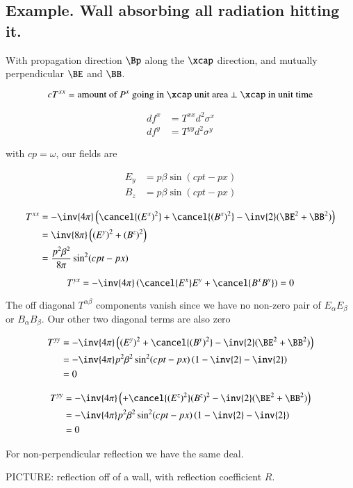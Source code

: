 \subsection{Example.  Wall absorbing all radiation hitting it.}

With propagation direction $\Bp$ along the $\xcap$ direction, and mutually perpendicular $\BE$ and $\BB$.

\begin{equation}\label{eqn:relativisticElectrodynamicsL23:410}
c T^{xx} = \text{amount of $P^x$ going in $\xcap$ unit area $\perp \xcap$ in unit time}
\end{equation}

\begin{align}\label{eqn:relativisticElectrodynamicsL23:430}
df^x &= T^{x x} d^2 \sigma^x \\
df^y &= T^{y y} d^2 \sigma^y
\end{align}

with $c p = \omega$, our fields are

\begin{align}\label{eqn:relativisticElectrodynamicsL23:450}
E_y &= p \beta \sin( c p t - p x ) \\
B_z &= p \beta \sin( c p t - p x ) 
\end{align}

\begin{align*}
T^{x x} 
&= -\inv{4 \pi} \left( 
\cancel{(E^x)^2}
+\cancel{(B^x)^2}
-\inv{2} (\BE^2 + \BB^2) \right) \\
&= \inv{8 \pi} \left( 
(E^y)^2
+(B^z)^2 \right) \\
&= \frac{p^2 \beta^2}{8 \pi} \sin^2 ( c p t - p x )
\end{align*}

\begin{equation}\label{eqn:relativisticElectrodynamicsL23:470}
T^{y x} = - \inv{4 \pi} \left( 
\cancel{ E^x } E^y + \cancel{ B^x B^y } \right) = 0
\end{equation}

The off diagonal $T^{\alpha \beta}$ components vanish since we have no non-zero pair of $E_\alpha E_\beta$ or $B_\alpha B_\beta$.  Our other two diagonal terms are also zero

\begin{align*}
T^{y y}
&= -\inv{4 \pi} \left( 
(E^y)^2
+\cancel{(B^y)^2}
-\inv{2} (\BE^2 + \BB^2) \right) \\
&= - \inv{4 \pi} p^2 \beta^2 \sin^2 ( c p t - p x ) \left( 1 - \inv{2} - \inv{2} \right) \\
&= 0
\end{align*}

\begin{align*}
T^{y y}
&= -\inv{4 \pi} \left( 
+\cancel{(E^z)^2}
(B^z)^2
-\inv{2} (\BE^2 + \BB^2) \right) \\
&= - \inv{4 \pi} p^2 \beta^2 \sin^2 ( c p t - p x ) \left( 1 - \inv{2} - \inv{2} \right)  \\
&= 0
\end{align*}

For non-perpendicular reflection we have the same deal.

PICTURE: reflection off of a wall, with reflection coefficient $R$.

\EndArticle
